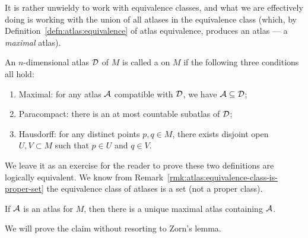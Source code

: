 \begin{remark}
It is rather unwieldy to work with equivalence classes, and what we are
effectively doing is working with the union of all atlases in the
equivalence class (which, by Definition~\ref{defn:atlas:equivalence}
of atlas equivalence, produces an atlas --- a \emph{maximal} atlas).
\end{remark}

\begin{definition}
An $n$-dimensional atlas $\mathcal{D}$ of $M$ is called a 
on $M$ if the following three conditions all hold:
\begin{enumerate}
\item Maximal: for any atlas $\mathcal{A}$ compatible with $\mathcal{D}$, we
  have $\mathcal{A}\subseteq\mathcal{D}$;
\item Paracompact: there is an at most countable subatlas of $\mathcal{D}$;
\item Hausdorff: for any distinct points $p,q\in M$, there exists
  disjoint open $U,V\subset M$ such that $p\in U$ and $q\in V$.
\end{enumerate}
\end{definition}

\begin{remark}
We leave it as an exercise for the reader to prove these two definitions
are logically equivalent. We know from Remark~\ref{rmk:atlas:equivalence-class-is-proper-set}
the equivalence class of atlases is a set (not a proper class).
\end{remark}

\begin{theorem}\label{thm:atlas:contained-in-unique-maximal-atlas}
If $\mathcal{A}$ is an atlas for $M$,
then there is a unique maximal atlas containing $\mathcal{A}$.
\end{theorem}

We will prove the claim without resorting to Zorn's lemma.

